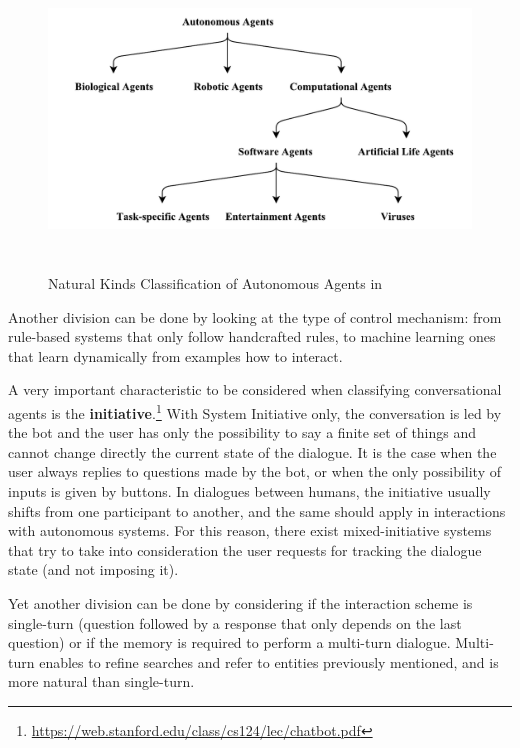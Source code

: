 \begin{figure}[!htb]
    \centering
    \includegraphics[max width=0.9\linewidth,max height=8cm,keepaspectratio]{figures/franklinClassification}
    \caption{Natural Kinds Classification of Autonomous Agents in~\cite{franklin1996agent}}\label{fig:franklinClassification}
\end{figure}

Another division can be done by looking at the type of control mechanism: from rule-based systems that only follow handcrafted rules, to machine learning ones that learn dynamically from examples how to interact.

A very important characteristic to be considered when classifying conversational agents is the \textbf{initiative}.\footnote{\url{https://web.stanford.edu/class/cs124/lec/chatbot.pdf}} With System Initiative only, the conversation is led by the bot and the user has only the possibility to say a finite set of things and cannot change directly the current state of the dialogue. It is the case when the user always replies to questions made by the bot, or when the only possibility of inputs is given by buttons. In dialogues between humans, the initiative usually shifts from one participant to another, and the same should apply in interactions with autonomous systems. For this reason, there exist mixed-initiative systems that try to take into consideration the user requests for tracking the dialogue state (and not imposing it).

Yet another division can be done by considering if the interaction scheme is single-turn (question followed by a response that only depends on the last question) or if the memory is required to perform a multi-turn dialogue. Multi-turn enables to refine searches and refer to entities previously mentioned, and is more natural than single-turn.

